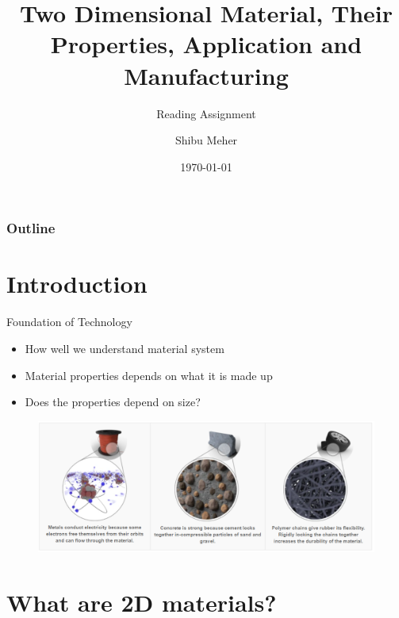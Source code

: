 \documentclass{beamer}
\title[Two Dimensional Materials]{Two Dimensional Material, Their Properties, Application and Manufacturing}
\subtitle{Reading Assignment}
\author{Shibu Meher}
\institute{IIT Bhubaneswar}
\date{\today}
\begin{document}
\begin{frame}
\titlepage
\end{frame}

\begin{frame}
\frametitle{Outline}
\tableofcontents
\end{frame}

\section{Introduction}

\begin{frame}{Foundation of Technology}
    \begin{itemize}
        \item How well we understand material system
        \item Material properties depends on what it is made up
        \item Does the properties depend on size?
    \end{itemize}
    \begin{figure}
        \centering
        \includegraphics[scale=0.5]{copper_concrete_rubber.PNG}
    \end{figure}
\end{frame}

\section{What are 2D materials?}
\end{document}

